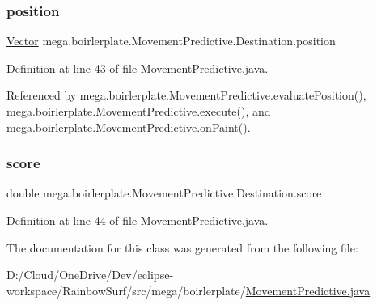 \subsubsection{\texorpdfstring{position}{position}}
{\footnotesize\ttfamily \hyperlink{classmega_1_1boirlerplate_1_1_vector}{Vector} mega.\+boirlerplate.\+Movement\+Predictive.\+Destination.\+position}



Definition at line 43 of file Movement\+Predictive.\+java.



Referenced by mega.\+boirlerplate.\+Movement\+Predictive.\+evaluate\+Position(), mega.\+boirlerplate.\+Movement\+Predictive.\+execute(), and mega.\+boirlerplate.\+Movement\+Predictive.\+on\+Paint().

\mbox{\label{classmega_1_1boirlerplate_1_1_movement_predictive_1_1_destination_a50a8627ed59861e176005fd1b7897ac0}} 
\subsubsection{\texorpdfstring{score}{score}}
{\footnotesize\ttfamily double mega.\+boirlerplate.\+Movement\+Predictive.\+Destination.\+score}



Definition at line 44 of file Movement\+Predictive.\+java.



The documentation for this class was generated from the following file\+:\begin{DoxyCompactItemize}
\item 
D\+:/\+Cloud/\+One\+Drive/\+Dev/eclipse-\/workspace/\+Rainbow\+Surf/src/mega/boirlerplate/\hyperlink{_movement_predictive_8java}{Movement\+Predictive.\+java}\end{DoxyCompactItemize}
